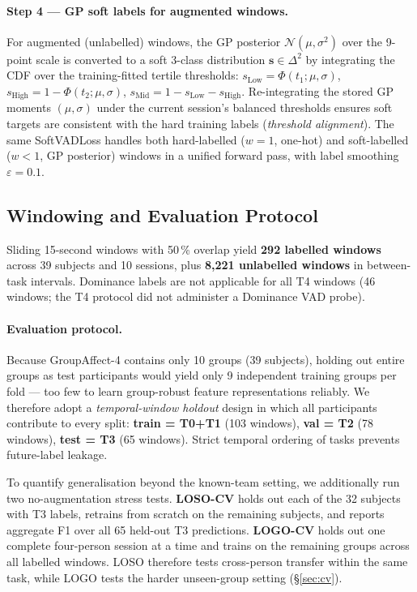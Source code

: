 \documentclass[sigconf,review,anonymous]{acmart}
\begin{document}
\paragraph{Step 4 --- GP soft labels for augmented windows.}
For augmented (unlabelled) windows, the GP posterior $\mathcal{N}(\mu, \sigma^2)$
over the 9-point scale is converted to a soft 3-class distribution
$\mathbf{s} \in \Delta^2$ by integrating the CDF over the training-fitted
tertile thresholds:
$s_{\text{Low}} = \Phi(t_1;\mu,\sigma)$,
$s_{\text{High}} = 1 - \Phi(t_2;\mu,\sigma)$,
$s_{\text{Mid}} = 1 - s_{\text{Low}} - s_{\text{High}}$.
Re-integrating the stored GP moments $(\mu, \sigma)$ under the current
session's balanced thresholds ensures soft targets are
consistent with the hard training labels (\emph{threshold alignment}).
The same SoftVADLoss handles both hard-labelled ($w = 1$, one-hot) and
soft-labelled ($w < 1$, GP posterior) windows in a unified forward pass,
with label smoothing $\varepsilon = 0.1$.

\subsection{Windowing and Evaluation Protocol}
\label{sec:splits}

Sliding 15-second windows with 50\,\% overlap yield \textbf{292 labelled
windows} across 39 subjects and 10 sessions, plus \textbf{8{,}221 unlabelled
windows} in between-task intervals.
Dominance labels are not applicable for all T4 windows (46 windows; the
T4 protocol did not administer a Dominance VAD probe).

\paragraph{Evaluation protocol.}
Because GroupAffect-4 contains only 10 groups (39 subjects), holding out
entire groups as test participants would yield only 9 independent training
groups per fold --- too few to learn group-robust feature representations
reliably.
We therefore adopt a \emph{temporal-window holdout} design in which all
participants contribute to every split:
\textbf{train = T0+T1} (103 windows),
\textbf{val = T2} (78 windows),
\textbf{test = T3} (65 windows).
Strict temporal ordering of tasks prevents future-label leakage.

To quantify generalisation beyond the known-team setting, we additionally run
two no-augmentation stress tests.
\textbf{LOSO-CV} holds out each of the 32 subjects with T3 labels, retrains
from scratch on the remaining subjects, and reports aggregate F1 over all
65 held-out T3 predictions.
\textbf{LOGO-CV} holds out one complete four-person session at a time and
trains on the remaining groups across all labelled windows.
LOSO therefore tests cross-person transfer within the same task, while LOGO
tests the harder unseen-group setting (\S\ref{sec:cv}).
\end{document}
